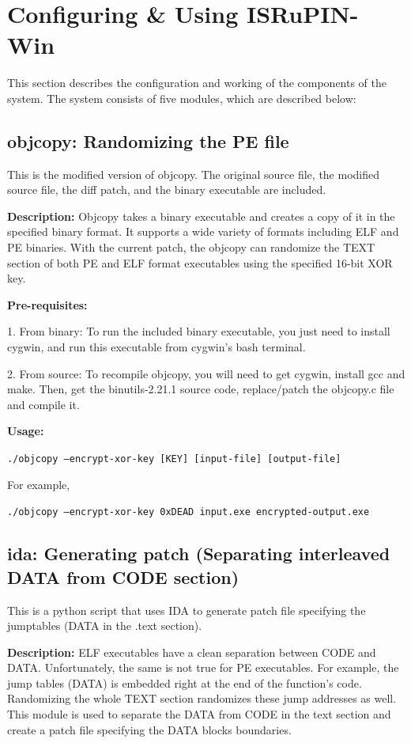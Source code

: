 \documentclass[a4paper,12pt]{llncs}
\begin{document}
\pagebreak

\section{Configuring \& Using ISRuPIN-Win}
\label{sec:design}
This section describes the configuration and working of the components of the system. The system consists of five modules, which are described below:

\subsection{objcopy: Randomizing the PE file}
This is the modified version of objcopy. The original source file,
the modified source file, the diff patch, and the binary executable are included.

\textbf{Description:}
Objcopy takes a binary executable and creates a copy of it in the specified binary format. It supports a wide variety of formats including ELF and PE binaries. With the current patch, the objcopy can randomize the TEXT section of both PE and ELF format executables using the specified 16-bit XOR key.

\textbf{Pre-requisites:}

1. From binary: To run the included binary executable, you just need to
install cygwin, and run this executable from cygwin's bash terminal.

2. From source: To recompile objcopy, you will need to get cygwin, install gcc and make.
Then, get the binutils-2.21.1 source code, replace/patch the objcopy.c file
and compile it.

\textbf{Usage:}

{\small \texttt{./objcopy --encrypt-xor-key [KEY] [input-file] [output-file]}}

For example,

{\small \texttt{./objcopy --encrypt-xor-key 0xDEAD input.exe encrypted-output.exe}}

\subsection{ida: Generating patch (Separating interleaved DATA from CODE section)}
This is a python script that uses IDA to generate patch file specifying
the jumptables (DATA in the .text section).

\textbf{Description:}
ELF executables have a clean separation between CODE and DATA. Unfortunately, the same is not true for PE executables. For example, the jump tables (DATA) is embedded right at the end of the function's code. Randomizing the whole TEXT section randomizes these jump addresses as well. This module is used to separate the DATA from CODE in the text section and create a patch file specifying the DATA blocks boundaries.
\end{document}
